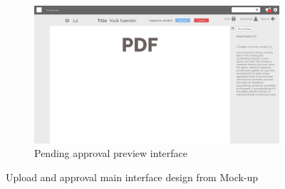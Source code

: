 \begin{figure}[H]\ContinuedFloat
	\centering
	\begin{subfigure}[b]{0.48\textwidth}
		\includegraphics[width=\textwidth]{billeder/iteration3Prototyper/Page_19.jpg}
		\caption{Pending approval preview interface}
		\label{fig:5-Approval2}
	\end{subfigure}
	\caption{Upload and approval main interface design from Mock-up}\label{fig:5-DocMockUp}
\end{figure}

